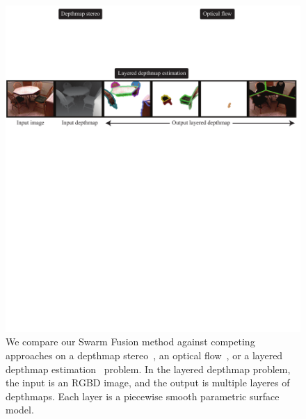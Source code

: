 %
\begin{figure}[tb]
  \includegraphics[width=\columnwidth]{figure/problem.pdf} \caption{We
    compare our Swarm Fusion method against competing approaches on a
    depthmap stereo~\cite{middlebury_stereo}, an optical
    flow~\cite{middlebury_optical_flow}, or a layered depthmap
    estimation~\cite{layered_depthmap} problem. In the layered
    depthmap problem, the input is an RGBD image, and the output is
    multiple layeres of depthmaps. Each layer is a piecewise smooth
    parametric surface model.}\label{fig:problem}
\end{figure}



